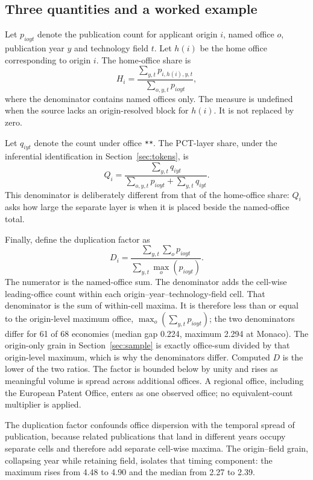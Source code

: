 \documentclass[a4paper,fleqn]{cas-dc}
\begin{document}
\subsection{Three quantities and a worked example}\label{sec:quantities}

Let $p_{ioyt}$ denote the publication count for applicant origin $i$, named
office $o$, publication year $y$ and technology field $t$. Let $h(i)$ be the
home office corresponding to origin $i$. The home-office share is
\[
 H_i =
 \frac{\sum_{y,t}p_{i,h(i),y,t}}
      {\sum_{o,y,t}p_{ioyt}},
\]
where the denominator contains named offices only. The measure is undefined
when the source lacks an origin-resolved block for $h(i)$. It is not replaced
by zero.

Let $q_{iyt}$ denote the count under office \texttt{**}. The PCT-layer share,
under the inferential identification in Section~\ref{sec:tokens}, is
\[
 Q_i =
 \frac{\sum_{y,t}q_{iyt}}
      {\sum_{o,y,t}p_{ioyt}+\sum_{y,t}q_{iyt}}.
\]
This denominator is deliberately different from that of the home-office
share: $Q_i$ asks how large the separate layer is when it is placed beside the
named-office total.

Finally, define the duplication factor as
\[
 D_i =
 \frac{\sum_{y,t}\sum_o p_{ioyt}}
      {\sum_{y,t}\max_o(p_{ioyt})}.
\]
The numerator is the named-office sum. The denominator adds the cell-wise
leading-office count within each origin--year--technology-field cell. That
denominator is the sum of within-cell maxima. It is therefore less than or
equal to the origin-level maximum office, $\max_o(\sum_{y,t}p_{ioyt})$; the
two denominators differ for 61 of 68 economies (median gap 0.224, maximum
2.294 at Monaco). The origin-only grain in Section~\ref{sec:sample} is exactly
office-sum divided by that origin-level maximum, which is why the denominators
differ. Computed $D$ is the lower of the two ratios. The factor is bounded
below by unity and rises as meaningful volume is spread across additional
offices. A regional office, including the European Patent Office, enters as
one observed office; no equivalent-count multiplier is applied.

The duplication factor confounds office dispersion with the temporal spread
of publication, because related publications that land in different years
occupy separate cells and therefore add separate cell-wise maxima. The
origin--field grain, collapsing year while retaining field, isolates that
timing component: the maximum rises from 4.48 to 4.90 and the median from
2.27 to 2.39.
\end{document}
